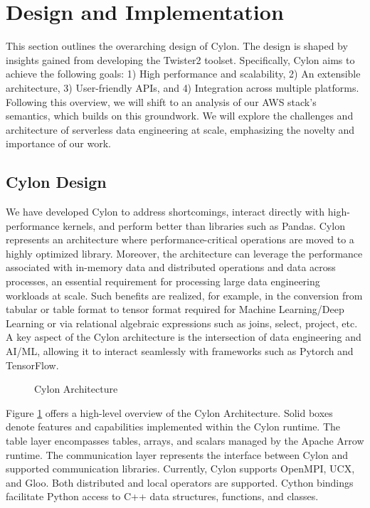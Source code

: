 \section{Design and Implementation}
\label{sec:design}

This section outlines the overarching design of Cylon. The design is shaped by insights gained from developing the Twister2 toolset. Specifically, Cylon aims to achieve the following goals: 1) High performance and scalability, 2) An extensible architecture, 3) User-friendly APIs, and 4) Integration across multiple platforms. Following this overview, we will shift to an analysis of our AWS stack's semantics, which builds on this groundwork. We will explore the challenges and architecture of serverless data engineering at scale, emphasizing the novelty and importance of our work\cite{pererathesis}.

\subsection{Cylon Design}

We have developed Cylon to address shortcomings, interact directly with high-performance kernels, and perform better than libraries such as Pandas.  Cylon represents an architecture where performance-critical operations are moved to a highly optimized library. Moreover, the architecture can leverage the performance associated with in-memory data and distributed operations and data across processes, an essential requirement for processing large data engineering workloads at scale. Such benefits are realized, for example, in the conversion from tabular or table format to tensor format required for Machine Learning/Deep Learning or via relational algebraic expressions such as joins, select, project, etc. A key aspect of the Cylon architecture is the intersection of data engineering and AI/ML, allowing it to interact seamlessly with frameworks such as Pytorch\cite{pytorch2019} and TensorFlow\cite{tensorflow2015}.

\begin{figure}[H]
    \centering
    
    \caption{Cylon Architecture}
    \label{fig:cylonarch}
\end{figure}

Figure \ref{fig:cylonarch} offers a high-level overview of the Cylon Architecture. Solid boxes denote features and capabilities implemented within the Cylon runtime. The table layer encompasses tables, arrays, and scalars managed by the Apache Arrow runtime. The communication layer represents the interface between Cylon and supported communication libraries. Currently, Cylon supports OpenMPI, UCX, and Gloo. Both distributed and local operators are supported. Cython bindings facilitate Python access to C++ data structures, functions, and classes.


